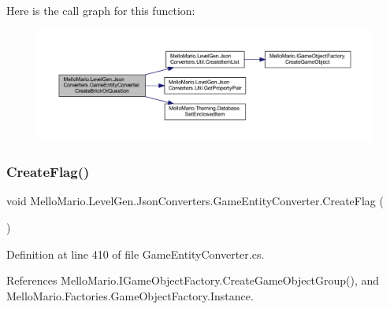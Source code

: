 Here is the call graph for this function\+:
\nopagebreak
\begin{figure}[H]
\begin{center}
\leavevmode
\includegraphics[width=350pt]{classMelloMario_1_1LevelGen_1_1JsonConverters_1_1GameEntityConverter_a3a832fa94bbe1390575d204c5da2f6aa_cgraph}
\end{center}
\end{figure}
\mbox{\label{classMelloMario_1_1LevelGen_1_1JsonConverters_1_1GameEntityConverter_adf9736309b65eaa7eaf68072201db239}} 
\subsubsection{Create\+Flag()}
{\footnotesize\ttfamily void Mello\+Mario.\+Level\+Gen.\+Json\+Converters.\+Game\+Entity\+Converter.\+Create\+Flag (\begin{DoxyParamCaption}{ }\end{DoxyParamCaption})\hspace{0.3cm}{\ttfamily [private]}}



Definition at line 410 of file Game\+Entity\+Converter.\+cs.



References Mello\+Mario.\+I\+Game\+Object\+Factory.\+Create\+Game\+Object\+Group(), and Mello\+Mario.\+Factories.\+Game\+Object\+Factory.\+Instance.


